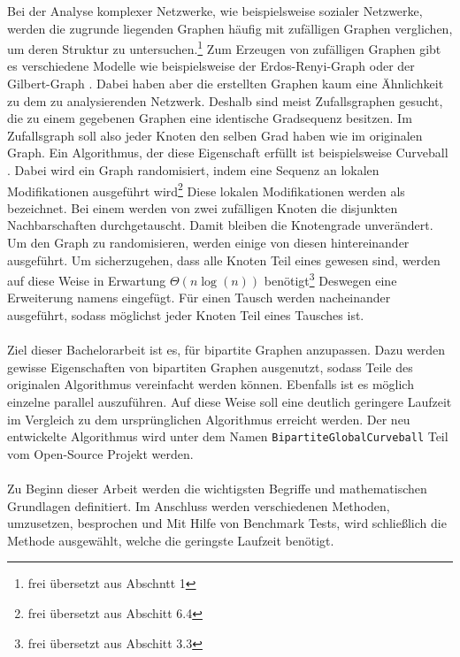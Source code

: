 \glqq Bei der Analyse komplexer Netzwerke, wie beispielsweise sozialer Netzwerke, 
werden die zugrunde liegenden Graphen häufig mit zufälligen Graphen verglichen, 
um deren Struktur zu untersuchen.\grqq\footnote{frei übersetzt aus \cite{DBLP:conf/esa/CarstensH0PTW18} Abschntt 1}
Zum Erzeugen von zufälligen Graphen gibt es verschiedene Modelle wie beispielsweise der Erdos-Renyi-Graph \cite{erdos}
oder der Gilbert-Graph \cite{gilbert}.
Dabei haben aber die erstellten Graphen kaum eine Ähnlichkeit zu dem zu analysierenden Netzwerk.
Deshalb sind meist Zufallsgraphen gesucht, die zu einem gegebenen Graphen eine identische Gradsequenz
besitzen. Im Zufallsgraph soll also jeder Knoten den selben Grad haben wie im originalen Graph.
Ein Algorithmus, der diese Eigenschaft erfüllt ist beispielsweise Curveball \cite{curveball}.
Dabei wird ein Graph \glqq randomisiert, indem eine Sequenz an lokalen Modifikationen ausgeführt wird\grqq{}\footnote{frei übersetzt aus \cite{penschuck2020recent} Abschitt 6.4}
Diese lokalen Modifikationen werden als \ct{} bezeichnet. Bei einem \ct{} werden von zwei zufälligen 
Knoten die disjunkten Nachbarschaften durchgetauscht. Damit bleiben die Knotengrade unverändert.
Um den Graph zu randomisieren, werden einige von diesen  hintereinander ausgeführt.
Um sicherzugehen, dass alle Knoten Teil eines  gewesen sind, werden auf diese Weise
\glqq in Erwartung $\Theta(n\log(n))$   benötigt\grqq \footnote{frei übersetzt aus \cite{DBLP:conf/esa/CarstensH0PTW18} Abschitt 3.3}
Deswegen  eine Erweiterung namens \gc{} \cite{DBLP:conf/esa/CarstensH0PTW18} eingefügt. 
Für einen \gc{} Tausch werden 
  nacheinander ausgeführt, sodass möglichst jeder Knoten Teil eines Tausches ist. 
\\
\\
Ziel dieser Bachelorarbeit ist es, \gc{} für bipartite Graphen anzupassen. Dazu werden gewisse 
Eigenschaften von bipartiten Graphen ausgenutzt, sodass Teile des originalen \gc{} Algorithmus
vereinfacht werden können. Ebenfalls ist es möglich einzelne  parallel auszuführen.
Auf diese Weise soll eine deutlich geringere Laufzeit im Vergleich zu dem ursprünglichen \gc{}
Algorithmus erreicht werden.
Der neu entwickelte Algorithmus wird unter dem Namen \texttt{BipartiteGlobalCurveball} 
Teil vom Open-Source Projekt \nk{} werden.
\\
\\
Zu Beginn dieser Arbeit werden die wichtigsten Begriffe und mathematischen Grundlagen definitiert.
Im Anschluss werden verschiedenen Methoden, \gc{} umzusetzen,  besprochen und  
Mit Hilfe von Benchmark Tests, wird schließlich die Methode ausgewählt, welche die geringste Laufzeit 
benötigt.
